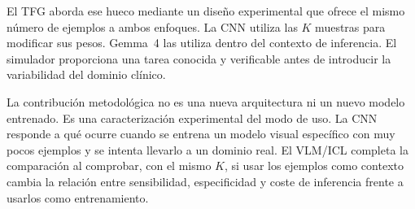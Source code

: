 El TFG aborda ese hueco mediante un diseño experimental que ofrece el mismo número de ejemplos a ambos enfoques. La CNN utiliza las \(K\) muestras para modificar sus pesos. Gemma~4 las utiliza dentro del contexto de inferencia. El simulador proporciona una tarea conocida y verificable antes de introducir la variabilidad del dominio clínico.

La contribución metodológica no es una nueva arquitectura ni un nuevo modelo entrenado. Es una caracterización experimental del modo de uso. La CNN responde a qué ocurre cuando se entrena un modelo visual específico con muy pocos ejemplos y se intenta llevarlo a un dominio real. El VLM/ICL completa la comparación al comprobar, con el mismo \(K\), si usar los ejemplos como contexto cambia la relación entre sensibilidad, especificidad y coste de inferencia frente a usarlos como entrenamiento.
